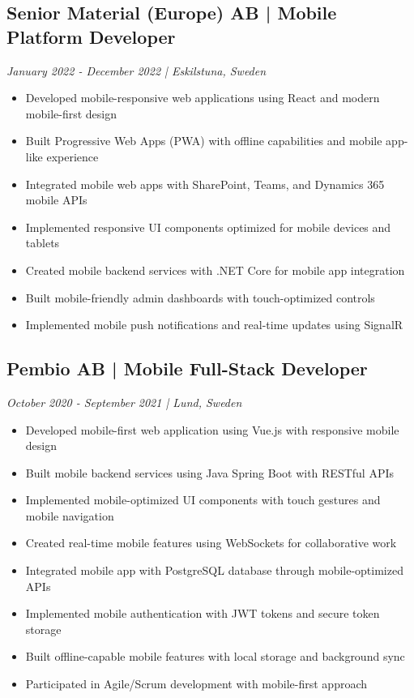 \documentclass[11pt,a4paper]{article}
\begin{document}
\subsection*{Senior Material (Europe) AB | Mobile Platform Developer}
\textit{January 2022 - December 2022 | Eskilstuna, Sweden}

\begin{itemize}[leftmargin=*, itemsep=2pt]
\item Developed mobile-responsive web applications using React and modern mobile-first design
\item Built Progressive Web Apps (PWA) with offline capabilities and mobile app-like experience
\item Integrated mobile web apps with SharePoint, Teams, and Dynamics 365 mobile APIs
\item Implemented responsive UI components optimized for mobile devices and tablets
\item Created mobile backend services with .NET Core for mobile app integration
\item Built mobile-friendly admin dashboards with touch-optimized controls
\item Implemented mobile push notifications and real-time updates using SignalR
\end{itemize}

\subsection*{Pembio AB | Mobile Full-Stack Developer}
\textit{October 2020 - September 2021 | Lund, Sweden}

\begin{itemize}[leftmargin=*, itemsep=2pt]
\item Developed mobile-first web application using Vue.js with responsive mobile design
\item Built mobile backend services using Java Spring Boot with RESTful APIs
\item Implemented mobile-optimized UI components with touch gestures and mobile navigation
\item Created real-time mobile features using WebSockets for collaborative work
\item Integrated mobile app with PostgreSQL database through mobile-optimized APIs
\item Implemented mobile authentication with JWT tokens and secure token storage
\item Built offline-capable mobile features with local storage and background sync
\item Participated in Agile/Scrum development with mobile-first approach
\end{itemize}
\end{document}
